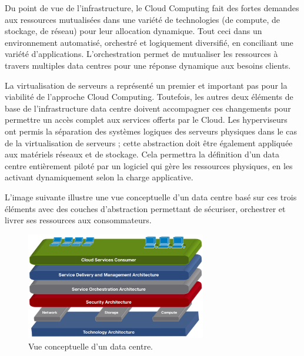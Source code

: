 Du point de vue de l'infrastructure, le Cloud Computing fait des fortes demandes aux ressources mutualisées dans une variété de technologies (de compute, de stockage, de réseau) pour leur allocation dynamique. Tout ceci dans un environnement automatisé, orchestré et logiquement diversifié, en conciliant une variété d'applications. L'orchestration permet de mutualiser les ressources à travers multiples data centres pour une réponse dynamique aux besoins clients. 


La virtualisation de serveurs a représenté un premier et important pas pour la viabilité de l'approche Cloud Computing. Toutefois, les autres deux éléments de base de l'infrastructure data centre doivent accompagner ces changements pour permettre un accès complet aux services offerts par le Cloud. Les hyperviseurs ont permis la séparation des systèmes logiques des serveurs physiques dans le cas de la virtualisation de serveurs ; cette abstraction doit être également appliquée aux matériels réseaux et de stockage. Cela permettra la définition d'un data centre entièrement piloté par un logiciel qui gère les ressources physiques, en les activant dynamiquement selon la charge applicative.


 L'image suivante illustre une vue conceptuelle d'un data centre basé sur ces trois éléments avec des couches d'abstraction permettant de sécuriser, orchestrer et livrer ses ressources aux consommateurs.\\

\begin{figure}[h]
\begin{center}

\includegraphics[width=0.7\textwidth]{images/CloudRefArchi} 
\caption{Vue conceptuelle d'un data centre. \cite{ciscoCCDCStrategyArchiSolutions}} \label{cloud_conceptual_view}

\end{center}
\end{figure}

